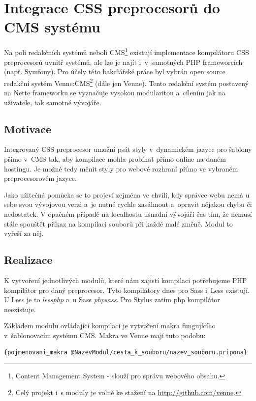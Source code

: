 \documentclass[thesis=B,czech]{FITthesis}[2012/06/26]
\begin{document}
\section{Integrace CSS preprocesorů do CMS systému}
\label{sec:cms}

Na poli redakčních systémů neboli CMS\footnote{Content Management System - slouží pro správu webového obsahu.} existují implementace kompilátoru CSS preprocesorů uvnitř systémů, ale lze je najít i~v~samotných PHP frameworcích (např. Symfony). Pro účely této bakalářské práce byl vybrán open source redakční systém Venne:CMS\footnote{Celý projekt i~s moduly je volně ke stažení na \url{http://github.com/venne}.} (dále jen Venne). Tento redakční systém postavený na Nette frameworku se vyznačuje vysokou modularitou a~cílením jak na uživatele, tak samotné vývojáře.



\subsection{Motivace}

Integrovaný CSS preprocesor umožní psát styly v~dynamickém jazyce pro šablony přímo v~CMS tak, aby kompilace mohla probíhat přímo online na daném hostingu. Je možné tedy měnit styly pro webové rozhraní přímo ve vybraném preprocesorovém jazyce. 

Jako užitečná pomůcka se to projeví zejména ve chvíli, kdy správce webu nemá u sebe svou vývojovou verzi a~je nutné rychle zasáhnout a~opravit nějakou chybu či nedostatek. V opačném případě na localhostu usnadní vývojáři čas tím, že nemusí stále spouštět příkaz na kompilaci souborů při každé malé změně. Modul to vyřeší za něj. 



\subsection{Realizace}

K vytvoření jednotlivých modulů, které nám zajistí kompilaci potřebujeme PHP kompilátor pro daný preprocesor. Tyto kompilátory dnes pro Sass i~Less existují. U Less je to \textit{lessphp} a~u Sass \textit{phpsass}. Pro Stylus zatím php kompilátor neexistuje.
 
Základem modulu ovládající kompilaci je vytvoření makra fungujícího v~šablonovacím systému CMS. Makra ve Venne mají tuto podobu:
\scriptsize
\begin{verbatim}
{pojmenovani_makra @NazevModul/cesta_k_souboru/nazev_souboru.pripona}
\end{verbatim}
\normalsize
\end{document}
